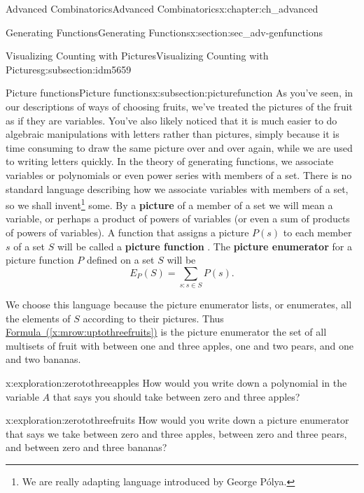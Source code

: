 \documentclass[oneside,10pt,]{book}
\newcommand{\terminology}[1]{\textbf{#1}}
\numberwithin{equation}{chapter}
\begin{document}
\begin{chapterptx}{Advanced Combinatorics}{}{Advanced Combinatorics}{}{}{x:chapter:ch_advanced}
\begin{sectionptx}{Generating Functions}{}{Generating Functions}{}{}{x:section:sec_adv-genfunctions}
\begin{subsectionptx}{Visualizing Counting with Pictures}{}{Visualizing Counting with Pictures}{}{}{g:subsection:idm5659}
\end{subsectionptx}
%
%
\typeout{************************************************}
\typeout{************************************************}
%
\begin{subsectionptx}{Picture functions}{}{Picture functions}{}{}{x:subsection:picturefunction}
As you've seen, in our descriptions of ways of choosing fruits, we've treated the pictures of the fruit as if they are variables. You've also likely noticed that it is much easier to do algebraic manipulations with letters rather than pictures, simply because it is time consuming to draw the same picture over and over again, while we are used to writing letters quickly. In the theory of generating functions, we associate variables or polynomials or even power series with members of a set. There is no standard language describing how we associate variables with members of a set, so we shall invent\footnote{We are really adapting language introduced by George Pólya.\label{g:fn:idm5730}} some. By a \terminology{picture} of a member of a set we will mean a variable, or perhaps a product of powers of variables (or even a sum of products of powers of variables). A function that assigns a picture \(P(s)\) to each member \(s\) of a set \(S\) will be called a \terminology{picture function} . The \terminology{picture enumerator} for a picture function \(P\) defined on a set \(S\) will be%
\begin{equation*}
E_P(S) = \sum_{s: s\in S}  P(s).
\end{equation*}
%
\par
We choose this language because the picture enumerator lists, or enumerates, all the elements of \(S\) according to their pictures. Thus \hyperref[x:mrow:uptothreefruits]{Formula~(\ref{x:mrow:uptothreefruits})} is the picture enumerator the set of all multisets of fruit with between one and three apples, one and two pears, and one and two bananas.%
\begin{exploration}{}{x:exploration:zerotothreeapples}%
How would you write down a polynomial in the variable \(A\) that says you should take between zero and three apples?%
\end{exploration}
\begin{exploration}{}{x:exploration:zerotothreefruits}%
How would you write down a picture enumerator that says we take between zero and three apples, between zero and three pears, and between zero and three bananas?%
\end{exploration}

\end{subsectionptx}
\end{sectionptx}
\end{chapterptx}
\end{document}
